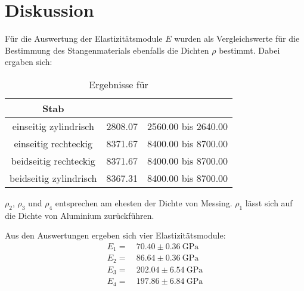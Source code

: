 \section{Diskussion}
\label{sec:Diskussion}


Für die Auswertung der Elastizitätsmodule $E$ wurden als Vergleichswerte für die Bestimmung des Stangenmaterials ebenfalls die Dichten $\rho$ bestimmt. Dabei ergaben sich:

\begin{table}
  \centering
  \caption{Ergebnisse für \rho }
  \label{tab:rho_ergebnisse}
  \begin{tabular}{S S S}
    \toprule 
   Stab &  &  \\ 
    \midrule 
    einseitig zylindrisch & 2808.07 & 2560.00 bis 2640.00 \\
    einseitig rechteckig & 8371.67 & 8400.00 bis 8700.00 \\
    beidseitig rechteckig & 8371.67 & 8400.00 bis 8700.00 \\
    beidseitig zylindrisch & 8367.31 & 8400.00 bis 8700.00 \\
    \bottomrule
  \end{tabular}
\end{table}

$\rho _2$, $\rho _3$ und $\rho _4$ entsprechen am ehesten der Dichte von Messing. $\rho _1$ lässt sich auf die Dichte von Aluminium zurückführen.

Aus den Auswertungen ergeben sich vier Elastizitätsmodule:
\begin{align}
    E_1 =& \: 70.40 \pm \SI{0.36}{\giga\pascal} \\
    E_2 =& \: 86.64 \pm \SI{0.36}{\giga\pascal} \\
    E_3 =& \: 202.04 \pm \SI{6.54}{\giga\pascal} \\
    E_4 =& \: 197.86 \pm \SI{6.84}{\giga\pascal}
\end{align}